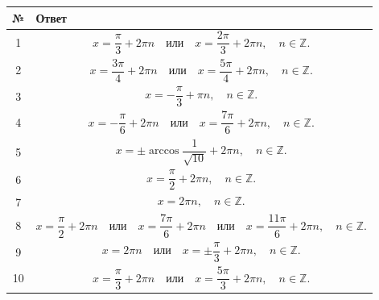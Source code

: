 \documentclass[a4paper,12pt]{article}
\newcommand{\Z}{\mathbb{Z}}
\begin{document}
\begin{center}
\renewcommand{\arraystretch}{1.55}
\begin{tabularx}{\linewidth}{@{}cX@{}}
\toprule
\textbf{№} & \textbf{Ответ} \\
\midrule
1 &
\[
x=\frac{\pi}{3}+2\pi n
\quad \text{или} \quad
x=\frac{2\pi}{3}+2\pi n,\quad n\in\Z.
\]
\\

2 &
\[
x=\frac{3\pi}{4}+2\pi n
\quad \text{или} \quad
x=\frac{5\pi}{4}+2\pi n,\quad n\in\Z.
\]
\\

3 &
\[
x=-\frac{\pi}{3}+\pi n,\quad n\in\Z.
\]
\\

4 &
\[
x=-\frac{\pi}{6}+2\pi n
\quad \text{или} \quad
x=\frac{7\pi}{6}+2\pi n,\quad n\in\Z.
\]
\\

5 &
\[
x=\pm\arccos\frac{1}{\sqrt{10}}+2\pi n,\quad n\in\Z.
\]
\\

6 &
\[
x=\frac{\pi}{2}+2\pi n,\quad n\in\Z.
\]
\\

7 &
\[
x=2\pi n,\quad n\in\Z.
\]
\\

8 &
\[
x=\frac{\pi}{2}+2\pi n
\quad \text{или} \quad
x=\frac{7\pi}{6}+2\pi n
\quad \text{или} \quad
x=\frac{11\pi}{6}+2\pi n,\quad n\in\Z.
\]
\\

9 &
\[
x=2\pi n
\quad \text{или} \quad
x=\pm\frac{\pi}{3}+2\pi n,\quad n\in\Z.
\]
\\

10 &
\[
x=\frac{\pi}{3}+2\pi n
\quad \text{или} \quad
x=\frac{5\pi}{3}+2\pi n,\quad n\in\Z.
\]
\\
\bottomrule
\end{tabularx}
\end{center}
\end{document}
